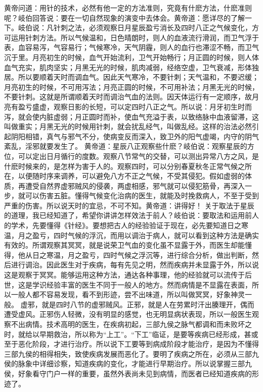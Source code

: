 \documentclass[a4paper,12pt,UTF8,twoside]{ctexbook}
\begin{document}
黄帝问道：用针的技术，必然有他一定的方法准则，究竟有什麽方法，什麽准则呢？岐伯回答说：要在一切自然现象的演变中去体会。黄帝道：愿详尽的了解一下。岐伯说：凡针刺之法，必须观察日月星辰盈亏消长及四时八正之气候变化，方可运用针刺方法。所以气候温和，日色晴朗时，则人的血液流行滑润，而卫气浮于表，血容易泻，气容易行；气候寒冷，天气阴霾，则人的血行也滞涩不畅，而卫气沉于里。月亮初生的时候，血气开始流利，卫气开始畅行；月正圆的时候，则人体血气充实，肌肉坚实；月黑无光的时候，肌肉减弱，经络空虚，卫气衰减，形体独居。所以要顺着天时而调血气。因此天气寒冷，不要针刺；天气温和，不要迟缓；月亮初生的时候，不可用泻法；月亮正圆的时候，不可用补法；月黑无光的时候，不要针刺。这就是所谓顺着天时而调治气血的法则。因天体运行有一定顺序，故月亮有盈亏盛虚，观察日影的长短，可以定四时八正之气。所以说：月牙初生时而泻，就会使内脏虚弱；月正圆时而补，使血气充溢于表，以致络脉中血液留滞，这叫做重实；月黑无光的时候用针刺，就会扰乱经气，叫做乱经。这样的治法必然引起阴阳相错，真气与邪气不分，使病变反而深入，致卫外的阳气虚竭，内守的阴气紊乱，淫邪就要发生了。
黄帝道：星辰八正观察些什麽？岐伯说：观察星辰的方位，可以定出日月循行的度数。观察八节常气的交替，可以测出异常八方之风，是什麽时候来的，是怎样为害于人的。观察四时，可以分别春夏秋冬正常气候之所在，以便随时序来调养，可以避免八方不正之气候，不受其侵犯。假如虚弱的体质，再遭受自然界虚邪贼风的侵袭，两虚相感，邪气就可以侵犯筋骨，再深入一步，就可以伤害五脏。懂得气候变化治病的医生，就能及时挽救病人，不至于受到严重的伤害。所以说天时的宜忌，不可不知。黄帝道：讲得好！
关于取法于星辰的道理，我已经知道了，希望你讲讲怎样效法于前人？岐伯说：要取法和运用前人的学术，先要懂得《针经》。要想把古人的经验验证于现在，必先要知道日之寒温，月之盈亏，四时气候的浮沉，而用以调治于病人，就可以看到这种方法是确实有效的。所谓观察其冥冥，就是说荣卫气血的变化虽不显露于外，而医生却能懂得，他从日之寒温，月之盈亏，四时气候之浮沉等，进行综合分析，做出判断，然后进行调治。因此医生对于疾病，每有先见之明，然而疾病并未显露于外，所以说这是观察于冥冥。能够运用这种方法，通达各种事理，他的经验就可以流传于后世，这是学识经验丰富的医生不同于一般人的地方。然而病情是不显露在表面，所以一般人都不容易发现，看不到形迹，尝不出味道，所以叫做冥冥，好象神灵一般。
虚邪，就是四时八节的虚邪贼风。正邪，就是人在劳累时汗出腠理开，偶而遭受虚风。正邪伤人轻微，没有明显的感觉，也无明显病状表现，所以一般医生观察不出病情。技术高明的医生，在疾病初起，三部九侯之脉气都调和而未败坏之时，就给以早期救治，所以称为“上工”。“下工”临证，是要等疾病已经形成，甚或至于恶化阶段，才进行治疗。所以说下工要等到病成阶段才能治疗，是因为不懂得三部九侯的相得相失，致使疾病发展而恶化了。要明了疾病之所在，必须从三部九侯的脉象中详细诊察，知道疾病的变化，才能进行早期治疗。所以说掌握三部九侯，好象看守门户一样的重要，虽然外表尚未见到病情，而医者已经知道疾病的形迹了。
\end{document}
